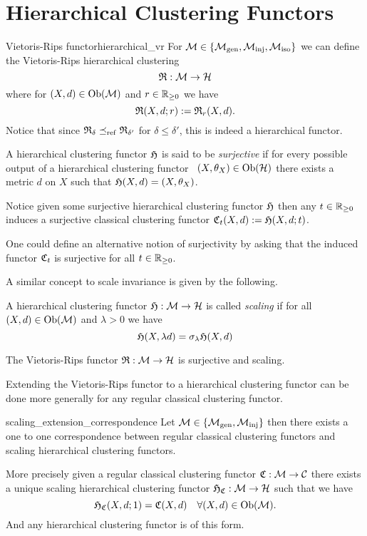 \chapter{Hierarchical Clustering Functors}

\begin{defprop}{Vietoris-Rips functor}{hierarchical_vr}
For $\mathcal{M} \in \{{\mathcal{M}_\mathrm{gen}},{\mathcal{M}_\mathrm{inj}},{\mathcal{M}_\mathrm{iso}}\}$ we can define the Vietoris-Rips hierarchical clustering
$$
\mathfrak{R}: \mathcal{M} \to \mathcal{H}
$$
where for $(X,d) \in \mathrm {Ob}(\mathcal{M})$ and $r \in \mathbb R_{\geq0}$ we have
$$
\mathfrak{R}(X,d; r) := \mathfrak{R}_r(X,d).
$$
Notice that since $\mathfrak{R}_\delta \preceq_\mathrm{ref} \mathfrak{R}_{\delta'}$ for $\delta \leq \delta'$, this is indeed a hierarchical functor.
\end{defprop}


\begin{definition}{}{}
    A hierarchical clustering functor $\mathfrak{H}$ is said to be \emph{surjective} if for every possible output of a hierarchical clustering functor \ie\ $(X, \theta_X) \in \mathrm {Ob}(\mathcal{H})$ there exists a metric $d$ on $X$ such that $\mathfrak{H}(X,d) = (X, \theta_X)$.
\end{definition}

Notice given some surjective hierarchical clustering functor $\mathfrak{H}$ then any $t \in \mathbb R_{\geq0}$ induces a surjective classical clustering functor $\mathfrak{C}_t(X,d) := \mathfrak{H}(X, d; t)$.


One could define an alternative notion of surjectivity by asking that the induced functor $\mathfrak{C}_t$ is surjective for all $t \in \mathbb R_{\geq0}$.

A similar concept to scale invariance is given by the following.

\begin{definition}{}{}
A hierarchical clustering functor $\mathfrak{H}: \mathcal{M} \to \mathcal{H}$ is called \emph{scaling} if for all $(X,d) \in \mathrm {Ob}(\mathcal{M})$ and $\lambda > 0$ we have
$$
\mathfrak{H}(X, \lambda d) = \sigma_\lambda \mathfrak{H}(X,d)
$$
\end{definition}

\begin{proposition}{}{}
The Vietoris-Rips functor $\mathfrak{R}: \mathcal{M} \to \mathcal{H}$ is surjective and scaling.
\end{proposition}



Extending the Vietoris-Rips functor to a hierarchical clustering functor can be done more generally for any regular classical clustering functor.
\begin{proposition}{}{scaling_extension_correspondence}
Let $\mathcal{M} \in \{{\mathcal{M}_\mathrm{gen}},{\mathcal{M}_\mathrm{inj}}\}$ then there exists a one to one correspondence between regular classical clustering functors and scaling hierarchical clustering functors.

\medskip
More precisely given a regular classical clustering functor $\mathfrak{C}: \mathcal{M} \to \mathcal{C}$ there exists a unique scaling hierarchical clustering functor $\mathfrak{H}_{\mathfrak{C}}: \mathcal{M} \to \mathcal{H}$ such that we have
$$
\mathfrak{H}_{\mathfrak{C}}(X,d; 1) = \mathfrak{C}(X,d) \quad \forall (X,d) \in \mathrm {Ob}(\mathcal{M}).
$$
And any hierarchical clustering functor is of this form.
\end{proposition}

